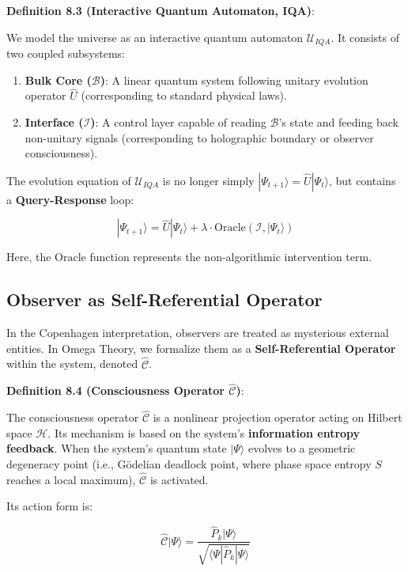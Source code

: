\textbf{Definition 8.3 (Interactive Quantum Automaton, IQA)}:

We model the universe as an interactive quantum automaton $\mathcal{U}_{IQA}$. It consists of two coupled subsystems:

\begin{enumerate}
\item \textbf{Bulk Core ($\mathcal{B}$)}: A linear quantum system following unitary evolution operator $\hat{U}$ (corresponding to standard physical laws).
\item \textbf{Interface ($\mathcal{I}$)}: A control layer capable of reading $\mathcal{B}$'s state and feeding back non-unitary signals (corresponding to holographic boundary or observer consciousness).
\end{enumerate}

The evolution equation of $\mathcal{U}_{IQA}$ is no longer simply $|\Psi_{t+1}\rangle = \hat{U} |\Psi_t\rangle$, but contains a \textbf{Query-Response} loop:

\[|\Psi_{t+1}\rangle = \hat{U} |\Psi_t\rangle + \lambda \cdot \text{Oracle}(\mathcal{I}, |\Psi_t\rangle)\]

Here, the $\text{Oracle}$ function represents the non-algorithmic intervention term.

\subsection{Observer as Self-Referential Operator}

In the Copenhagen interpretation, observers are treated as mysterious external entities. In Omega Theory, we formalize them as a \textbf{Self-Referential Operator} within the system, denoted $\hat{\mathcal{C}}$.

\textbf{Definition 8.4 (Consciousness Operator $\hat{\mathcal{C}}$)}:

The consciousness operator $\hat{\mathcal{C}}$ is a nonlinear projection operator acting on Hilbert space $\mathcal{H}$. Its mechanism is based on the system's \textbf{information entropy feedback}.
When the system's quantum state $|\Psi\rangle$ evolves to a geometric degeneracy point (i.e., G\"{o}delian deadlock point, where phase space entropy $S$ reaches a local maximum), $\hat{\mathcal{C}}$ is activated.

Its action form is:

\[\hat{\mathcal{C}} |\Psi\rangle = \frac{\hat{P}_k |\Psi\rangle}{\sqrt{\langle \Psi | \hat{P}_k | \Psi \rangle}}\]

